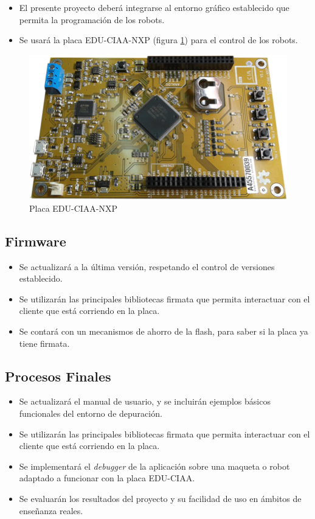 \begin{itemize}
	\item El presente proyecto deberá integrarse al entorno gráfico establecido que permita la programación de los robots.	
	\item Se usará la placa EDU-CIAA-NXP (figura \ref{fig:edu-ciaa-nxp}) para el control de los robots.	
\end{itemize}

\begin{figure}[h]
	\centering
	\includegraphics[width=14cm]{./Figures/EDU-CIAA-NXP_Foto.png}
	\caption{Placa EDU-CIAA-NXP}
	\label{fig:edu-ciaa-nxp}
\end{figure}

\subsection{Firmware}

\begin{itemize}
	\item Se actualizará a la última versión, respetando el control de versiones establecido.	
	\item Se utilizarán las principales bibliotecas firmata que permita interactuar con el cliente que está corriendo en la placa.
	\item Se contará con un mecanismos de ahorro de la flash, para saber si la placa ya tiene firmata.
\end{itemize}

\subsection{Procesos Finales}

\begin{itemize}
	\item Se actualizará el manual de usuario, y se incluirán ejemplos básicos funcionales del entorno de depuración.	
	\item Se utilizarán las principales bibliotecas firmata que permita interactuar con el cliente que está corriendo en la placa.
	\item Se implementará el \emph{debugger} de la aplicación sobre una maqueta o robot adaptado a funcionar con la placa EDU-CIAA.
	\item Se evaluarán los resultados del proyecto y su facilidad de uso en ámbitos de enseñanza reales.
\end{itemize}

